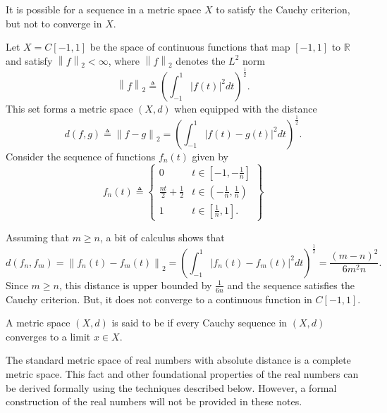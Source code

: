 It is possible for a sequence in a metric space $X$ to satisfy the Cauchy criterion, but not to converge in $X$.

\begin{example}
\label{example:ContinuousFunctionsCauchy}
Let $X=C[-1,1]$ be the space of continuous functions that map $[-1,1]$ to $\mathbb{R}$ and satisfy $\left\| f \right\|_2 < \infty$, where $\left\| f \right\|_2$ denotes the $L^2$ norm
\begin{equation*}
\left\| f \right\|_2 \triangleq \left( \int_{-1}^1 |f(t)|^2 dt \right)^{\frac{1}{2}}.
\end{equation*}
This set forms a metric space $(X,d)$ when equipped with the distance
\[ d(f, g) \triangleq \left\| f - g \right\|_2
= \left( \int_{-1}^1 |f(t) - g(t)|^2 dt \right)^{\frac{1}{2}}. \]
Consider the sequence of functions $f_n(t)$ given by
\begin{equation*}
f_n(t) \triangleq \left\{ \begin{array}{ll}
0 & t \in \left[ -1, -\frac{1}{n} \right] \\
\frac{nt}{2} + \frac{1}{2} & t \in \left( -\frac{1}{n}, \frac{1}{n} \right) \\
1 & t \in \left[ \frac{1}{n}, 1 \right].
\end{array} \right\}
\end{equation*}

Assuming that $m \geq n$, a bit of calculus shows that
\begin{equation*}
d(f_n, f_m) = \left\| f_n(t) - f_m(t) \right\|_2
= \left( \int_{-1}^1 |f_n(t) - f_m(t)|^2 dt \right)^{\frac{1}{2}}
= \frac{(m-n)^2}{6m^2n}.
\end{equation*}
Since $m\geq n$, this distance is upper bounded by $\frac{1}{6n}$ and the sequence satisfies the Cauchy criterion.
But, it does not converge to a continuous function in $C[-1,1]$.
\end{example}

\begin{definition}
A metric space $(X,d)$ is said to be  if every Cauchy sequence in $(X,d)$ converges to a limit $x \in X$.
\end{definition}

The standard metric space of real numbers with absolute distance is a complete metric space.
This fact and other foundational properties of the real numbers can be derived formally using the techniques described below.
However, a formal construction of the real numbers will not be provided in these notes.

